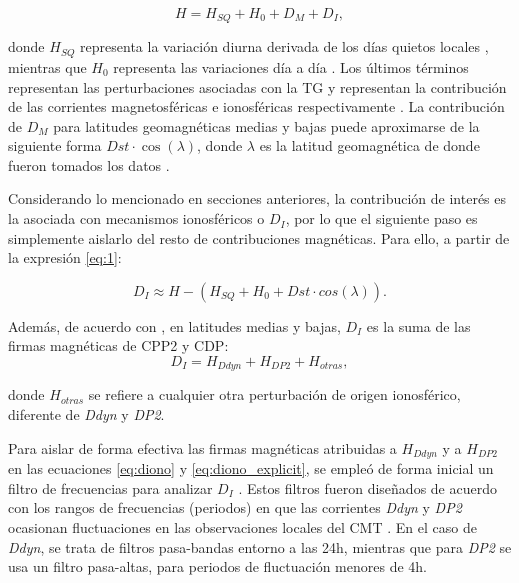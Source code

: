 \begin{equation}
    \label{eq:1}
        H = H_{SQ} + H_0 + D_{M} + D_{I},
\end{equation}

donde $H_{SQ}$ representa la variación diurna derivada de los días quietos locales \cite{vanKampt}, mientras que $H_0$ representa las variaciones día a día \cite{baseline_Gjerloev}. Los últimos términos representan las perturbaciones asociadas con la TG y representan la contribución de las corrientes magnetosféricas e ionosféricas respectivamente \cite{ddyn2005, angeoddyn}. La contribución de $D_M$ para latitudes geomagnéticas medias y bajas puede aproximarse de la siguiente forma $Dst \cdot \cos(\lambda)$, donde $\lambda$ es la latitud geomagnética de donde fueron tomados los datos \cite{amorymazaudier_2017}. 
\vspace{1 em}

Considerando lo mencionado en secciones anteriores, la contribución de interés es la asociada con mecanismos ionosféricos o $D_I$, por lo que el siguiente paso es simplemente aislarlo del resto de contribuciones magnéticas. Para ello, a partir de la expresión \ref{eq:1}:

\begin{equation}
\label{eq:diono}
   D_{I} \approx H -(H_{SQ} +  H_0 + Dst \cdot cos(\lambda)).
\end{equation}

Además, de acuerdo con \cite{ddyn2005, angeoddyn}, en latitudes medias y bajas, $D_I$ es la suma de las firmas magnéticas de CPP2 y CDP:
\begin{equation}
\label{eq:diono_explicit}
   D_{I} = H_{Ddyn} + H_{DP2} + H_{otras},
\end{equation}

donde $H_{otras}$ se refiere a cualquier otra perturbación de origen ionosférico, diferente de \emph{Ddyn} y \emph{DP2}.
\vspace{1 em}

Para aislar de forma efectiva las firmas magnéticas atribuidas a $H_{Ddyn}$ y a $H_{DP2}$ en las ecuaciones \ref{eq:diono} y \ref{eq:diono_explicit}, se empleó de forma inicial un filtro de frecuencias para analizar $D_I$ \cite{amory2020_filtros}. Estos filtros fueron diseñados de acuerdo con los rangos de frecuencias (periodos) en que las corrientes \emph{Ddyn} y \emph{DP2} ocasionan fluctuaciones en las observaciones locales del CMT \cite{nishida_68_fluctuations, blanc_ddyn, ddyn_diag2}. En el caso de \emph{Ddyn}, se trata de filtros pasa-bandas entorno a las 24h, mientras que para \emph{DP2} se usa un filtro pasa-altas, para periodos de fluctuación menores de 4h. 

